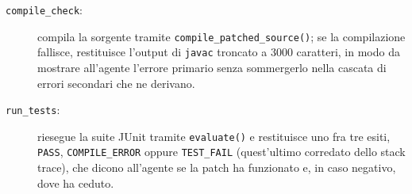 \begin{description}
    \item[\texttt{compile\_check}:] compila la sorgente tramite \texttt{compile\_patched\_source()}; se la
    compilazione fallisce, restituisce l'output di \texttt{javac} troncato a 3000 caratteri, in modo da mostrare
    all'agente l'errore primario senza sommergerlo nella cascata di errori secondari che ne derivano.

    \item[\texttt{run\_tests}:] riesegue la suite JUnit tramite \texttt{evaluate()} e restituisce uno fra tre esiti, 
    \texttt{PASS}, \texttt{COMPILE\_ERROR} oppure \texttt{TEST\_FAIL} (quest'ultimo corredato dello stack trace), 
    che dicono all'agente se la patch ha funzionato e, in caso negativo, dove ha ceduto.
\end{description}

\clearpage